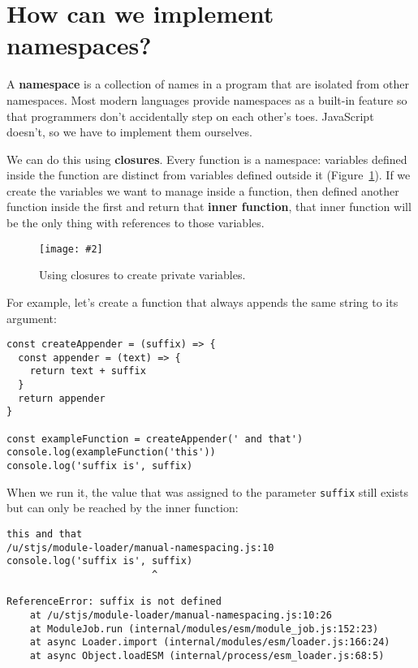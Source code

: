 \documentclass[krantzl]{krantz}
\newcommand{\figpdfhere}[4]{\begin{figure}[h]%
\centering%
\texttt{[image: \#2]}%
\caption{#3}%
\label{#1}%
\end{figure}}
\newcommand{\figref}[1]{Figure~\ref{#1}}
\newcommand{\glossref}[1]{\textbf{#1}}
\begin{document}
\section{How can we implement namespaces?}\label{module-loader-namespace}


A \glossref{namespace} is a collection of names in a program
that are isolated from other namespaces.
Most modern languages provide namespaces as a built-in feature
so that programmers don’t accidentally step on each other’s toes.
JavaScript doesn’t,
so we have to implement them ourselves.


We can do this using \glossref{closures}.
Every function is a namespace:
variables defined inside the function are distinct from variables defined outside it
(\figref{module-loader-closures}).
If we create the variables we want to manage inside a function,
then defined another function inside the first
and return that \glossref{inner function},
that inner function will be the only thing with references to those variables.

\figpdfhere{module-loader-closures}{./module-loader/closures.pdf}{Using closures to create private variables.}{0.6}


For example,
let’s create a function that always appends the same string to its argument:


\begin{lstlisting}[frame=tblr]
const createAppender = (suffix) => {
  const appender = (text) => {
    return text + suffix
  }
  return appender
}

const exampleFunction = createAppender(' and that')
console.log(exampleFunction('this'))
console.log('suffix is', suffix)
\end{lstlisting}



\noindent When we run it,
the value that was assigned to the parameter \texttt{suffix} still exists
but can only be reached by the inner function:


\begin{lstlisting}[frame=tblr,backgroundcolor=\color{black!5}]
this and that
/u/stjs/module-loader/manual-namespacing.js:10
console.log('suffix is', suffix)
                         ^

ReferenceError: suffix is not defined
    at /u/stjs/module-loader/manual-namespacing.js:10:26
    at ModuleJob.run (internal/modules/esm/module_job.js:152:23)
    at async Loader.import (internal/modules/esm/loader.js:166:24)
    at async Object.loadESM (internal/process/esm_loader.js:68:5)
\end{lstlisting}
\end{document}
